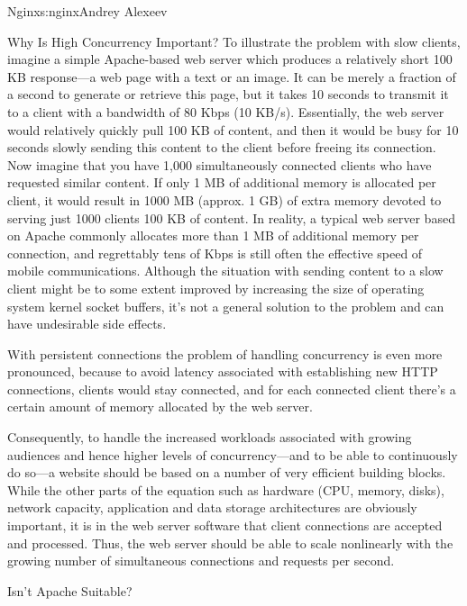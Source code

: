 \begin{aosachapter}{Nginx}{s:nginx}{Andrey Alexeev}
\begin{aosasect1}{Why Is High Concurrency Important?}
To illustrate the problem with slow clients, imagine a simple
Apache-based web server which produces a relatively short 100 KB
response---a web page with a text or an image. It can be merely a
fraction of a second to generate or retrieve this page, but it takes
10 seconds to transmit it to a client with a bandwidth of 80 Kbps (10
KB/s). Essentially, the web server would relatively quickly pull 100
KB of content, and then it would be busy for 10 seconds slowly sending
this content to the client before freeing its connection. Now imagine
that you have 1,000 simultaneously connected clients who have
requested similar content. If only 1 MB of additional memory is
allocated per client, it would result in 1000 MB (approx. 1 GB) of
extra memory devoted to serving just 1000 clients 100 KB of
content. In reality, a typical web server based on Apache commonly
allocates more than 1 MB of additional memory per connection, and
regrettably tens of Kbps is still often the effective speed of mobile
communications. Although the situation with sending content to a slow
client might be to some extent improved by increasing the size of
operating system kernel socket buffers, it's not a general solution to
the problem and can have undesirable side effects.

With persistent connections the problem of handling concurrency is
even more pronounced, because to avoid latency associated with
establishing new HTTP connections, clients would stay connected, and
for each connected client there's a certain amount of memory allocated
by the web server.

Consequently, to handle the increased workloads associated with
growing audiences and hence higher levels of concurrency---and to be
able to continuously do so---a website should be based on a number of
very efficient building blocks. While the other parts of the equation
such as hardware (CPU, memory, disks), network capacity, application
and data storage architectures are obviously important, it is in the
web server software that client connections are accepted and
processed. Thus, the web server should be able to scale nonlinearly
with the growing number of simultaneous connections and requests per
second.

\begin{aosasect2}{Isn't Apache Suitable?}


\end{aosasect2}
\end{aosasect1}
\end{aosachapter}
